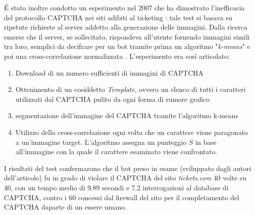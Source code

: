 \'E stato inoltre condotto un esperimento nel 2007 che ha dimostrato l'inefficacia del protocollo CAPTCHA nei siti adibiti al ticketing \cite{caine2007ai}: tale test si basava su ripetute richieste al server addetto alla generazione delle immagini. Dalla ricerca emerse che il server, se sollecitato, rispondeva all'utente fornendo immagini simili tra loro, semplici da decifrare per un bot tramite prima un algoritmo "\emph{k-means}" e poi una cross-correlazione normalizzata \cite{dimicco2001dynamic}. 
L'esperimento era così articolato: 
\begin{enumerate}
\item Download di un numero sufficienti di immagini di CAPTCHA
\item Ottenimento di un cosiddetto \textit{Template}, ovvero un elenco di tutti i caratteri utilizzati dal CAPTCHA pulito da ogni forma di rumore grafico
\item segmentazione dell'immagine del CAPTCHA tramite l'algoritmo k-means
\item Utilizzo della cross-correlazione ogni volta che un carattere viene paragonato a un'immagine target. L'algoritmo assegna un punteggio $S$ in base all'immagine con la quale il carattere esaminato viene confrontato.
\end{enumerate}
I risultati del test confermarono che il bot preso in esame (sviluppato dagli autori dell'articolo) fu in grado di violare il CAPTCHA del sito \textit{tickets.com} 40 volte su 40, con un tempo medio di 9.89 secondi e 7.2 interrogazioni al database di CAPTCHA, contro i 60 concessi dal firewall del sito per il completamento del CAPTCHA daparte di un essere umano.
